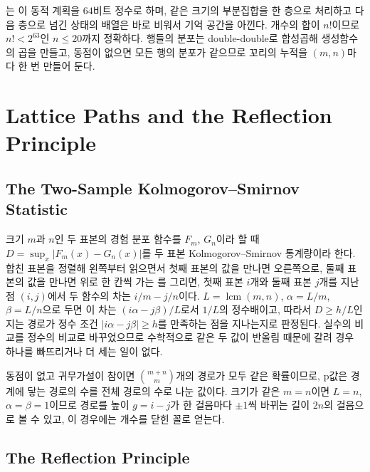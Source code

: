 \begin{instardust}
는 이 동적 계획을 $64$비트 정수로 하며, 같은 크기의 부분집합을 한 층으로 처리하고 다음 층으로 넘긴 상태의 배열은 바로 비워서 기억 공간을 아낀다. 개수의 합이 $n!$이므로 $n!<2^{63}$인 $n\le20$까지 정확하다. 행들의 분포는 double-double로 합성곱해 생성함수의 곱을 만들고, 동점이 없으면 모든 행의 분포가 같으므로 꼬리의 누적을 $(m,n)$마다 한 번 만들어 둔다.
\end{instardust}

\section{Lattice Paths and the Reflection Principle}
\label{sec:lattice}

\subsection{The Two-Sample Kolmogorov--Smirnov Statistic}

크기 $m$과 $n$인 두 표본의 경험 분포 함수를 $F_m$, $G_n$이라 할 때 $D=\sup_x|F_m(x)-G_n(x)|$를 두 표본 Kolmogorov--Smirnov 통계량이라 한다. 합친 표본을 정렬해 왼쪽부터 읽으면서 첫째 표본의 값을 만나면 오른쪽으로, 둘째 표본의 값을 만나면 위로 한 칸씩 가는 를 그리면, 첫째 표본 $i$개와 둘째 표본 $j$개를 지난 점 $(i,j)$에서 두 함수의 차는 $i/m-j/n$이다. $L=\operatorname{lcm}(m,n)$, $\alpha=L/m$, $\beta=L/n$으로 두면 이 차는 $(i\alpha-j\beta)/L$로서 $1/L$의 정수배이고, 따라서 $D\ge h/L$인지는 경로가 정수 조건 $|i\alpha-j\beta|\ge h$를 만족하는 점을 지나는지로 판정된다. 실수의 비교를 정수의 비교로 바꾸었으므로 수학적으로 같은 두 값이 반올림 때문에 갈려 경우 하나를 빠뜨리거나 더 세는 일이 없다.

동점이 없고 귀무가설이 참이면 $\binom{m+n}m$개의 경로가 모두 같은 확률이므로, p값은 경계에 닿는 경로의 수를 전체 경로의 수로 나눈 값이다. 크기가 같은 $m=n$이면 $L=n$, $\alpha=\beta=1$이므로 경로를 높이 $g=i-j$가 한 걸음마다 $\pm1$씩 바뀌는 길이 $2n$의 걸음으로 볼 수 있고, 이 경우에는 개수를 닫힌 꼴로 얻는다.

\subsection{The Reflection Principle}

